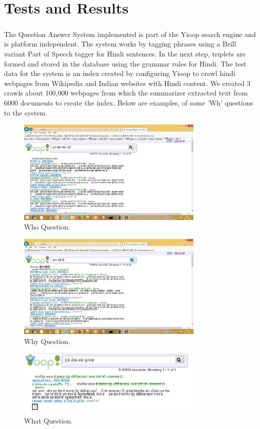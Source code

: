 \chapter{Tests and Results}

\paragraph{}
The Question Answer System implemented is part of the Yioop search engine and is platform independent. The system works by tagging phrases using a Brill variant Part of Speech tagger for Hindi sentences. In the next step, triplets are formed and stored in the database using the grammar rules for Hindi. The test data for the system is an index created by configuring Yioop to crawl hindi webpages from Wikipedia and Indian websites with Hindi content. We created 3 crawls about 100,000 webpages from which the summarizer extracted text from 6000 documents to create the index. Below are examples, of some 'Wh' questions to the system.

\begin{figure}[htb]
\centering
\includegraphics[width=0.8\textwidth]{images/who_question.jpg}
\caption{Who Question.} 
\label{fig:who_question}
\end{figure}

\begin{figure}[htb]
\centering
\includegraphics[width=0.8\textwidth]{images/why_question.jpg}
\caption{Why Question.} 
\label{fig:why_question}
\end{figure}

\begin{figure}[htb]
\centering
\includegraphics[width=0.8\textwidth]{images/what_question.jpg}
\caption{What Question.} 
\label{fig:what_question}
\end{figure}